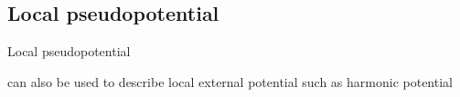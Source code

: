 \subsection{Local pseudopotential}

Local pseudopotential

can also be used to describe local external potential
such as harmonic potential


